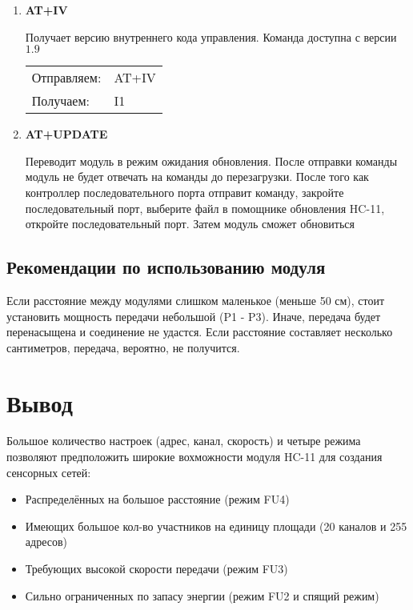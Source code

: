 \begin{enumerate}
\item \textbf{AT+IV}

Получает версию внутреннего кода управления. Команда доступна с версии $1.9$

\begin{tabular}{ l l }
  Отправляем: & AT+IV \\
  Получаем: & I1\\
\end{tabular}


\item \textbf{AT+UPDATE}

Переводит модуль в режим ожидания обновления.
После отправки команды модуль не будет отвечать на команды до перезагрузки.
После того как контроллер последовательного порта отправит команду, закройте последовательный порт, выберите файл в помощнике обновления HC-11, откройте последовательный порт. Затем модуль сможет обновиться

\end{enumerate}

\subsection{Рекомендации по использованию модуля}

Если расстояние между модулями слишком маленькое (меньше 50 см), стоит установить мощность передачи небольшой (P1 - P3). Иначе, передача будет перенасыщена и соединение не удастся. Если расстояние составляет несколько сантиметров, передача, вероятно, не получится.


\section{Вывод}

Большое количество настроек (адрес, канал, скорость) и четыре режима позволяют предположить широкие вохможности модуля HC-11 для создания сенсорных сетей:
 
\begin{itemize}
\item Распределённых на большое расстояние (режим FU4)
\item Имеющих большое кол-во участников на единицу площади (20 каналов и 255 адресов)
\item Требующих высокой скорости передачи (режим FU3)

\item Сильно ограниченных по запасу энергии (режим FU2 и спящий режим)

\end{itemize}


